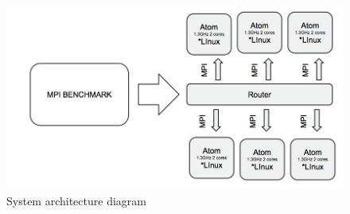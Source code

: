\begin{figure}[H]
\centering
\includegraphics[width=1\textwidth]{images/cluster_minnows.png}
\caption{System architecture diagram }
\label{fig:4.4}
\end{figure}

\noindent

\clearpage
